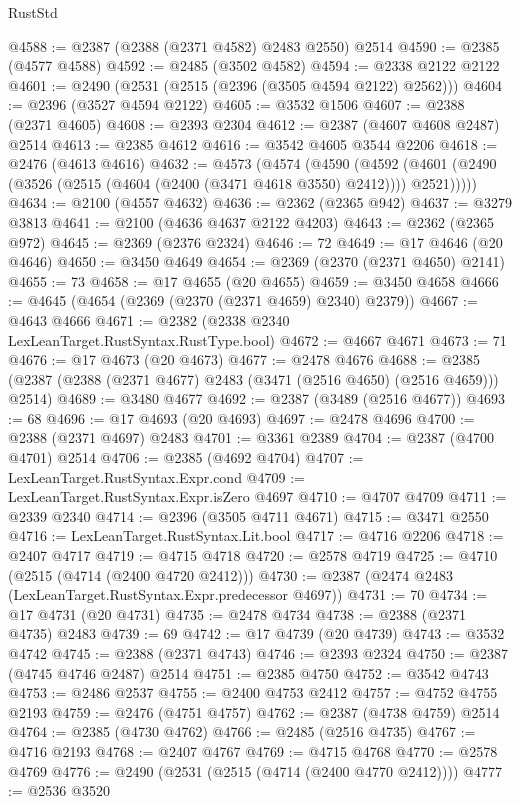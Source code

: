 \begin{lexlean}{RustStd}
\begin{coremodule}
{\begin{coremodule}
{{{{{{{{{{{{{{{{{{{{{{{{{{{{{{{{{{{{{{{{{{{{{{{{{{@4588 := @2387 (@2388 (@2371 @4582) @2483 @2550) @2514
@4590 := @2385 (@4577 @4588)
@4592 := @2485 (@3502 @4582)
@4594 := @2338 @2122 @2122
@4601 := @2490 (@2531 (@2515 (@2396 (@3505 @4594 @2122) @2562)))
@4604 := @2396 (@3527 @4594 @2122)
@4605 := @3532 @1506
@4607 := @2388 (@2371 @4605)
@4608 := @2393 @2304
@4612 := @2387 (@4607 @4608 @2487) @2514
@4613 := @2385 @4612
@4616 := @3542 @4605 @3544 @2206
@4618 := @2476 (@4613 @4616)
@4632 := @4573
    (@4574
      (@4590
        (@4592 (@4601 (@2490 (@3526 (@2515 (@4604 (@2400 (@3471 @4618 @3550) @2412)))) @2521)))))
@4634 := @2100 (@4557 @4632)
@4636 := @2362 (@2365 @942)
@4637 := @3279 @3813
@4641 := @2100 (@4636 @4637 @2122 @4203)
@4643 := @2362 (@2365 @972)
@4645 := @2369 (@2376 @2324)
@4646 := 72
@4649 := @17 @4646 (@20 @4646)
@4650 := @3450 @4649
@4654 := @2369 (@2370 (@2371 @4650) @2141)
@4655 := 73
@4658 := @17 @4655 (@20 @4655)
@4659 := @3450 @4658
@4666 := @4645 (@4654 (@2369 (@2370 (@2371 @4659) @2340) @2379))
@4667 := @4643 @4666
@4671 := @2382 (@2338 @2340 LexLeanTarget.RustSyntax.RustType.bool)
@4672 := @4667 @4671
@4673 := 71
@4676 := @17 @4673 (@20 @4673)
@4677 := @2478 @4676
@4688 := @2385 (@2387 (@2388 (@2371 @4677) @2483 (@3471 (@2516 @4650) (@2516 @4659))) @2514)
@4689 := @3480 @4677
@4692 := @2387 (@3489 (@2516 @4677))
@4693 := 68
@4696 := @17 @4693 (@20 @4693)
@4697 := @2478 @4696
@4700 := @2388 (@2371 @4697) @2483
@4701 := @3361 @2389
@4704 := @2387 (@4700 @4701) @2514
@4706 := @2385 (@4692 @4704)
@4707 := LexLeanTarget.RustSyntax.Expr.cond
@4709 := LexLeanTarget.RustSyntax.Expr.isZero @4697
@4710 := @4707 @4709
@4711 := @2339 @2340
@4714 := @2396 (@3505 @4711 @4671)
@4715 := @3471 @2550
@4716 := LexLeanTarget.RustSyntax.Lit.bool
@4717 := @4716 @2206
@4718 := @2407 @4717
@4719 := @4715 @4718
@4720 := @2578 @4719
@4725 := @4710 (@2515 (@4714 (@2400 @4720 @2412)))
@4730 := @2387 (@2474 @2483 (LexLeanTarget.RustSyntax.Expr.predecessor @4697))
@4731 := 70
@4734 := @17 @4731 (@20 @4731)
@4735 := @2478 @4734
@4738 := @2388 (@2371 @4735) @2483
@4739 := 69
@4742 := @17 @4739 (@20 @4739)
@4743 := @3532 @4742
@4745 := @2388 (@2371 @4743)
@4746 := @2393 @2324
@4750 := @2387 (@4745 @4746 @2487) @2514
@4751 := @2385 @4750
@4752 := @3542 @4743
@4753 := @2486 @2537
@4755 := @2400 @4753 @2412
@4757 := @4752 @4755 @2193
@4759 := @2476 (@4751 @4757)
@4762 := @2387 (@4738 @4759) @2514
@4764 := @2385 (@4730 @4762)
@4766 := @2485 (@2516 @4735)
@4767 := @4716 @2193
@4768 := @2407 @4767
@4769 := @4715 @4768
@4770 := @2578 @4769
@4776 := @2490 (@2531 (@2515 (@4714 (@2400 @4770 @2412))))
@4777 := @2536 @3520
}}}}}}}}}}}}}}}}}}}}}}}}}}}}}}}}}}}}}}}}}}}}}}}}}}
\end{coremodule}}
\end{coremodule}
\end{lexlean}
